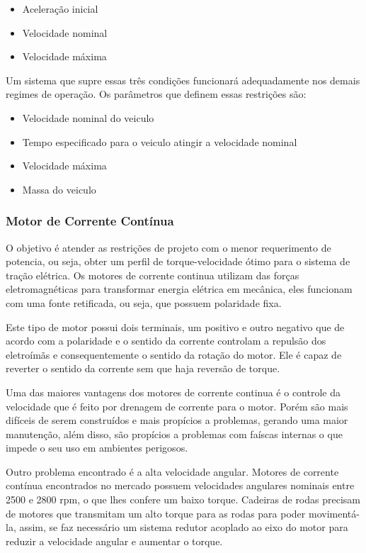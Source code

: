 \begin{itemize}
	\item Aceleração inicial
	\item Velocidade nominal
	\item Velocidade máxima
\end{itemize}

Um sistema que supre essas três condições funcionará adequadamente nos demais regimes de operação. Os parâmetros que definem essas restrições são:

\begin{itemize}
	\item Velocidade nominal do veiculo
    \item Tempo especificado para o veiculo atingir a velocidade nominal
    \item Velocidade máxima
    \item Massa do veiculo
\end{itemize}

\subsubsection{Motor de Corrente Contínua}

O objetivo é atender as restrições de projeto com o menor requerimento de potencia, ou seja, obter um perfil de torque-velocidade ótimo para o sistema de tração elétrica. Os motores de corrente continua utilizam das forças eletromagnéticas para transformar energia elétrica em mecânica, eles funcionam com uma fonte retificada, ou seja, que possuem polaridade fixa.

Este tipo de motor possui dois terminais, um positivo e outro negativo que de acordo com a polaridade e o sentido da corrente controlam a repulsão dos eletroímãs e consequentemente o sentido da rotação do motor. Ele é capaz de reverter o sentido da corrente sem que haja reversão de torque.

Uma das maiores vantagens dos motores de corrente continua é o controle da velocidade que é feito por drenagem de corrente para o motor. Porém são mais difíceis de serem construídos e mais propícios a problemas, gerando uma maior manutenção, além disso, são propícios a problemas com faíscas internas o que impede o seu uso em ambientes perigosos.

Outro problema encontrado é a alta velocidade angular. Motores de corrente contínua encontrados no mercado possuem velocidades angulares nominais entre 2500 e 2800 rpm, o que lhes confere um baixo torque. Cadeiras de rodas precisam de motores que transmitam um alto torque para as rodas para poder movimentá-la, assim, se faz necessário um sistema redutor acoplado ao eixo do motor para reduzir a velocidade angular e aumentar o torque.

